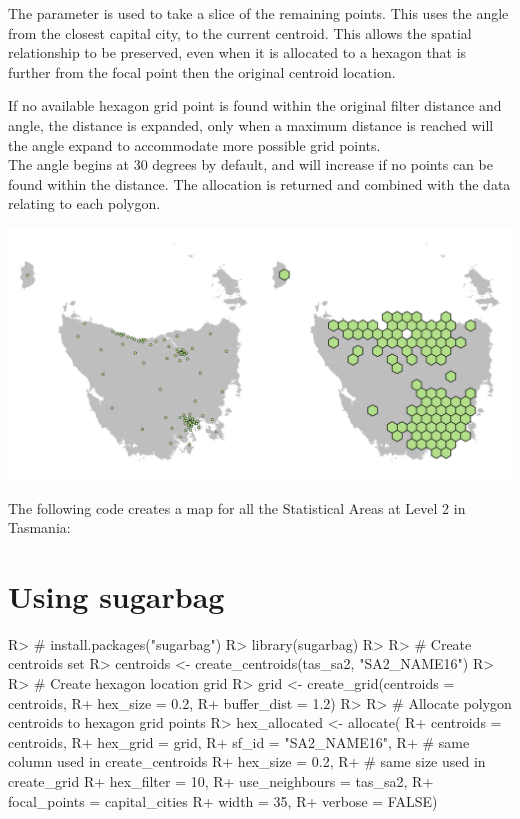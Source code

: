 \documentclass[
]{jss}
\begin{document}
The  parameter is used to take a slice of the remaining
points. This uses the angle from the closest capital city, to the
current centroid. This allows the spatial relationship to be preserved,
even when it is allocated to a hexagon that is further from the focal
point then the original centroid location.

If no available hexagon grid point is found within the original filter
distance and angle, the distance is expanded, only when a maximum
distance is reached will the angle expand to accommodate more possible
grid points.\\
The angle begins at 30 degrees by default, and will increase if no
points can be found within the  distance. The
allocation is returned and combined with the data relating to each
polygon.

\begin{CodeChunk}


\begin{center}\includegraphics[width=1\linewidth]{figures/6allocate} \end{center}

\end{CodeChunk}

The following code creates a map for all the Statistical Areas at Level
2 in Tasmania:

\hypertarget{using-sugarbag}{%
\section{Using sugarbag}\label{using-sugarbag}}

\begin{CodeChunk}

\begin{CodeInput}
R> # install.packages("sugarbag")
R> library(sugarbag)
R> 
R> # Create centroids set
R> centroids <- create_centroids(tas_sa2, "SA2_NAME16")
R> 
R> # Create hexagon location grid
R> grid <- create_grid(centroids = centroids,
R+     hex_size = 0.2,
R+     buffer_dist = 1.2)
R> 
R> # Allocate polygon centroids to hexagon grid points
R> hex_allocated <- allocate(
R+   centroids = centroids,
R+   hex_grid = grid,
R+   sf_id = "SA2_NAME16",
R+   # same column used in create_centroids
R+   hex_size = 0.2,
R+   # same size used in create_grid
R+   hex_filter = 10,
R+   use_neighbours = tas_sa2,
R+   focal_points = capital_cities %
R+   width = 35,
R+   verbose = FALSE)
\end{CodeInput}
\end{CodeChunk}
\end{document}
